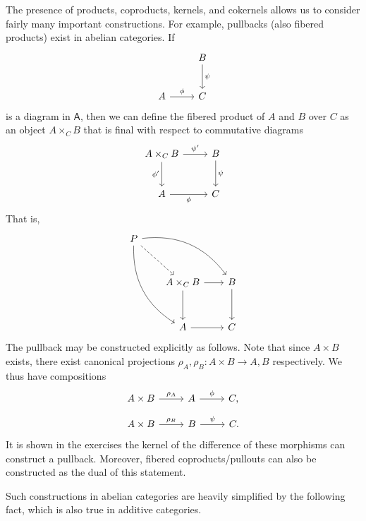 The presence of products, coproducts, kernels, and cokernels allows us to consider fairly many important constructions. For example, pullbacks (also fibered products) exist in abelian categories. If
\[\begin{tikzcd}[row sep = 2.5em, column sep = 2.5em]
	&B\arrow[d, "\psi "]\\
	A\arrow[r, "\phi "]&C
\end{tikzcd}\]
is a diagram in $\mathsf{A} $, then we can define the fibered product of $A$ and $B$ over $C$ as an object $A\times _C B$ that is final with respect to commutative diagrams
\[\begin{tikzcd}[row sep = 2.5em, column sep = 2.5em]
	A\times _CB\arrow[r, "\psi '"]\arrow[d, "\phi '"']&B\arrow[d, "\psi "]\\
	A\arrow[r, "\phi "']&C
\end{tikzcd}\]
That is,
\[\begin{tikzcd}[row sep = 3em, column sep = 2em]
	P\arrow[dr, dashed]\arrow[drr, bend left]\arrow[ddr, bend right]\\
	&A\times _CB\arrow[r]\arrow[d]&B\arrow[d]\\
	&A\arrow[r]&C
\end{tikzcd}\]
The pullback may be constructed explicitly as follows. Note that since $A\times B$ exists, there exist canonical projections $\rho_A,\rho _B : A\times B \to A,B$ respectively. We thus have compositions
\[\begin{tikzcd}[row sep = 2.5em, column sep = 2.5em]
	A\times B\arrow[r, "\rho _A"]&A\arrow[r, "\phi "]&C,
\end{tikzcd}\]
\[\begin{tikzcd}[row sep = 2.5em, column sep = 2.5em]
	A\times B\arrow[r, "\rho _B"]&B\arrow[r, "\psi "]&C.
\end{tikzcd}\]
It is shown in the exercises the kernel of the difference of these morphisms can construct a pullback. Moreover, fibered coproducts/pullouts can also be constructed as the dual of this statement.

Such constructions in abelian categories are heavily simplified by the following fact, which is also true in additive categories.

